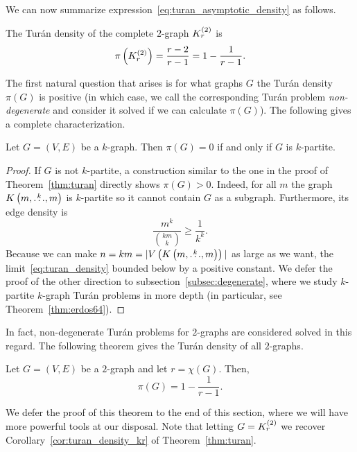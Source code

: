 We can now summarize expression~\eqref{eq:turan_asymptotic_density} as follows.
\begin{corollary} \label{cor:turan_density_kr}
    The Turán density of the complete $2$-graph $K^{(2)}_{r}$ is
    \[
        \pi\left(K^{(2)}_{r}\right) = \frac{r-2}{r-1} = 1 - \frac{1}{r-1}.
    \]
\end{corollary}

The first natural question that arises is for what graphs $G$ the Turán density $\pi(G)$ is positive
(in which case, we call the corresponding Turán problem \emph{non-degenerate}
and consider it solved if we can calculate $\pi(G)$).
The following gives a complete characterization.

\begin{proposition} \label{prop:degenerate}
    Let $G = (V, E)$ be a $k$-graph.
    Then $\pi(G) = 0$ if and only if $G$ is $k$-partite.
    \begin{proof}
        If $G$ is not $k$-partite, a construction similar to the one in the proof of Theorem~\ref{thm:turan}
        directly shows $\pi (G) > 0$.
        Indeed, for all $m$ the graph $K\left(m, \overset{k}{\dots}, m\right)$ is $k$-partite so it cannot contain $G$ as a subgraph.
        Furthermore, its edge density is
        \[
             \frac{m^k}{\binom{km}{k}} \geq \frac{1}{k^k}.
        \]
        Because we can make $n = km = |V\left( K\left(m, \overset{k}{\dots}, m\right) \right)|$ as large as we want,
        the limit~\eqref{eq:turan_density} bounded below by a positive constant.
        We defer the proof of the other direction to subsection~\ref{subsec:degenerate},
        where we study $k$-partite $k$-graph Turán problems
        in more depth (in particular, see Theorem~\ref{thm:erdos64}).
    \end{proof}
\end{proposition}

In fact, non-degenerate Turán problems for $2$-graphs are considered solved in this regard.
The following theorem gives the Turán density of all $2$-graphs.

\begin{theorem}
    \label{thm:erdos_stone_simonovits}
    Let $G = (V, E)$ be a $2$-graph and let $r = \chi(G)$.
    Then,
    \[
        \pi(G) = 1 - \frac{1}{r - 1}.
    \]
\end{theorem}

We defer the proof of this theorem to the end of this section,
where we will have more powerful tools at our disposal.
Note that letting $G = K^{(2)}_{r}$ we recover
Corollary~\ref{cor:turan_density_kr} of Theorem~\ref{thm:turan}.

